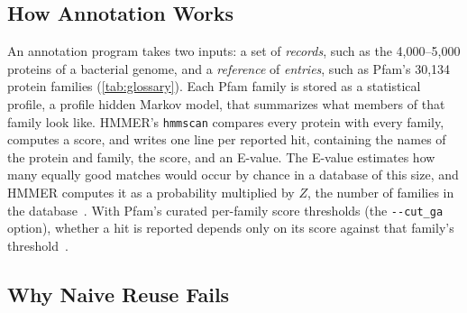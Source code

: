 \documentclass[letterpaper,twocolumn,10pt]{article}
\theoremstyle{definition}
\newcommand{\cutga}{\texttt{-{}-cut\_ga}\xspace}
\begin{document}
\subsection{How Annotation Works}

An annotation program takes two inputs: a set of \textit{records}, such as the 4{,}000--5{,}000 proteins of a bacterial
genome, and a \textit{reference} of \textit{entries}, such as Pfam's 30{,}134 protein families (\cref{tab:glossary}).
Each Pfam family is stored as a statistical profile, a profile hidden Markov model, that summarizes what members
of that family look like. HMMER's \texttt{hmmscan} compares every protein with every family, computes a score, and
writes one line per reported hit, containing the names of the protein and family, the score, and an E-value. The
E-value estimates how many equally good matches would occur by chance in a database of this size, and HMMER computes
it as a probability multiplied by $Z$, the number of families in the database~\cite{eddy2011hmmer}. With Pfam's curated
per-family score thresholds (the \cutga option), whether a hit is reported depends only on its score against that
family's threshold~\cite{pfam2025}.

\subsection{Why Naive Reuse Fails}
\end{document}

